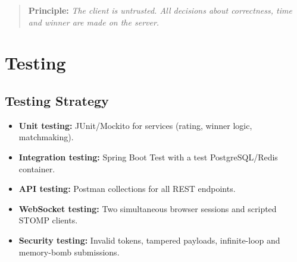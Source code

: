 \documentclass[12pt,a4paper,oneside]{report}
\begin{document}
\begin{quote}
\textbf{Principle:} \emph{The client is untrusted. All decisions about correctness, time and winner are made on the server.}
\end{quote}

\chapter{Testing}
\section{Testing Strategy}
\begin{itemize}[leftmargin=*]
  \item \textbf{Unit testing:} JUnit/Mockito for services (rating, winner logic, matchmaking).
  \item \textbf{Integration testing:} Spring Boot Test with a test PostgreSQL/Redis container.
  \item \textbf{API testing:} Postman collections for all REST endpoints.
  \item \textbf{WebSocket testing:} Two simultaneous browser sessions and scripted STOMP clients.
  \item \textbf{Security testing:} Invalid tokens, tampered payloads, infinite-loop and memory-bomb submissions.
\end{itemize}
\end{document}
